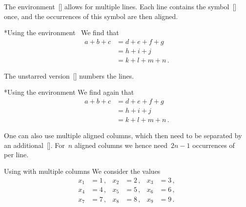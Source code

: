The environment~[\envname] allows for multiple lines.
Each line contains the symbol~\inlinecode{\&}\massindex{\&}[\inlinecode] once, and the occurrences of this symbol are then aligned.
\begin{showlatex}*{Using the environment~}
We find that
\begin{align*}
  a + b + c
  &=
  d + e + f + g
  \\
  &=
  h + i + j
  \\
  &=
  k + l + m + n \,.
\end{align*}
\end{showlatex}
The unstarred version~[\envname] numbers the lines.
\begin{showlatex}*{Using the environment }
We find again that
\begin{align}
  a + b + c
  &=
  d + e + f + g
  \\
  &=
  h + i + j
  \\
  &=
  k + l + m + n \,.
\end{align}
\end{showlatex}
One can also use multiple aligned columns, which then need to be separated by an additional~\inlinecode{\&}\massindex{\&}[\inlinecode].
For~$n$ aligned columns we hence need~$2n-1$ occurrences of~\inlinecode{\&} per line.
\begin{showlatex}{Using  with multiple columns}
We consider the values
\begin{align*}
  x_1 &= 1 \,,  &   x_2 &= 2 \,,  &   x_3 &= 3 \,,  \\
  x_4 &= 4 \,,  &   x_5 &= 5 \,,  &   x_6 &= 6 \,,  \\
  x_7 &= 7 \,,  &   x_8 &= 8 \,,  &   x_9 &= 9 \,.
\end{align*}
\end{showlatex}


